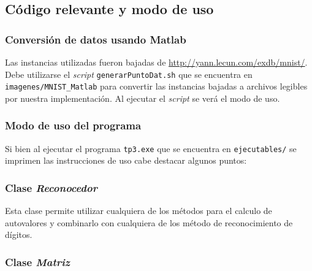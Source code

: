 \subsection{C\'odigo relevante y modo de uso}

	\subsubsection{Conversi\'on de datos usando Matlab}
		Las instancias utilizadas fueron bajadas de \url{http://yann.lecun.com/exdb/mnist/}.
		Debe utilizarse el \textit{script} \texttt{generarPuntoDat.sh} que se
		encuentra en \texttt{imagenes/MNIST\_Matlab}
		para convertir las instancias bajadas a archivos legibles por
		nuestra implementaci\'on. Al ejecutar el \textit{script} se
		ver\'a el modo de uso.

	\subsubsection{Modo de uso del programa}
		Si bien al ejecutar el programa \texttt{tp3.exe} que se encuentra
		en \texttt{ejecutables/} se imprimen las instrucciones de uso
		cabe destacar algunos puntos:

	\subsubsection{Clase \textit{Reconocedor}}
		Esta clase permite utilizar cualquiera de los m\'etodos para el calculo
		de autovalores y combinarlo con cualquiera de los m\'etodo de reconocimiento
		de d\'igitos.
		
		

	\subsubsection{Clase \textit{Matriz}}

		
